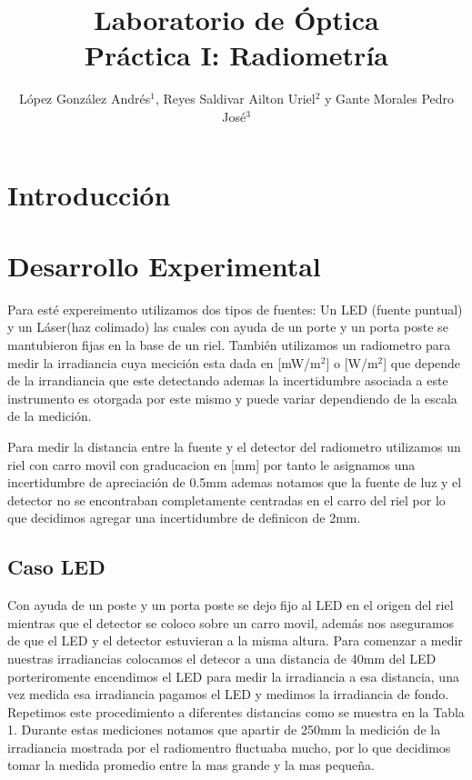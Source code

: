 \documentclass[article,12pt]{elsarticle}
\begin{document}

\begin{frontmatter}
    \title{Laboratorio de Óptica \\  Práctica  I: Radiometría}
    \author{López González Andrés$^1$, Reyes Saldivar Ailton Uriel$^2$ y Gante Morales Pedro José$^3$} %
    \address{$^1$ Facultad de Ciencias, Universidad Nacional Autónoma de México, M\'exico CDMX.}


    
\end{frontmatter}

\vspace{0.5cm} 

\section{Introducción}



\section{Desarrollo Experimental}
Para esté expereimento utilizamos dos tipos de fuentes: Un LED (fuente puntual) y un Láser(haz colimado) las cuales con ayuda de un porte y un porta poste se mantubieron fijas en la base de un riel. También utilizamos un radiometro para medir la irradiancia cuya mecición esta dada en [mW/m$^2$] o [W/m$^2$] que depende de la irrandiancia que este detectando ademas la incertidumbre asociada a este instrumento es otorgada por este mismo y puede variar dependiendo de la escala de la medición.

Para medir la distancia entre la fuente y el detector del radiometro utilizamos un riel con carro movil con graducacion en [mm] por tanto le asignamos una incertidumbre de apreciación de 0.5mm ademas notamos que la fuente de luz y el detector no se encontraban completamente centradas en el carro del riel por lo que decidimos agregar una incertidumbre de definicon de 2mm.

\subsection{Caso LED}
Con ayuda de un poste y un porta poste se dejo fijo al LED en el origen del riel mientras que el detector se coloco sobre un carro movil, además nos aseguramos de que el LED y el detector estuvieran a la misma altura. Para comenzar a medir nuestras irradiancias colocamos el detecor a una distancia de 40mm del LED porteriromente encendimos el LED para medir la irradiancia a esa distancia, una vez medida esa irradiancia pagamos el LED y medimos la irradiancia de fondo. Repetimos este procedimiento a diferentes distancias como se muestra en la Tabla 1.
Durante estas mediciones notamos que apartir de 250mm la medición de la irradiancia mostrada por el radiomentro fluctuaba mucho, por lo que decidimos tomar la medida promedio entre la mas grande y la mas pequeña. 
\end{document}
